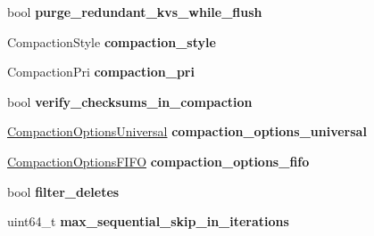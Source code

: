 \begin{DoxyCompactItemize}
\item 
bool {\bfseries purge\+\_\+redundant\+\_\+kvs\+\_\+while\+\_\+flush}\hypertarget{structrocksdb_1_1ColumnFamilyOptions_ad2a4d376117a9caa7d25b3aa15c9d7b9}{}\label{structrocksdb_1_1ColumnFamilyOptions_ad2a4d376117a9caa7d25b3aa15c9d7b9}

\item 
Compaction\+Style {\bfseries compaction\+\_\+style}\hypertarget{structrocksdb_1_1ColumnFamilyOptions_af23f2504801df411a8ba336743bc3481}{}\label{structrocksdb_1_1ColumnFamilyOptions_af23f2504801df411a8ba336743bc3481}

\item 
Compaction\+Pri {\bfseries compaction\+\_\+pri}\hypertarget{structrocksdb_1_1ColumnFamilyOptions_a0795b8f337f5a63fd9666648202a02e3}{}\label{structrocksdb_1_1ColumnFamilyOptions_a0795b8f337f5a63fd9666648202a02e3}

\item 
bool {\bfseries verify\+\_\+checksums\+\_\+in\+\_\+compaction}\hypertarget{structrocksdb_1_1ColumnFamilyOptions_a467caa4ed08291dccd0e378edfaf99ab}{}\label{structrocksdb_1_1ColumnFamilyOptions_a467caa4ed08291dccd0e378edfaf99ab}

\item 
\hyperlink{classrocksdb_1_1CompactionOptionsUniversal}{Compaction\+Options\+Universal} {\bfseries compaction\+\_\+options\+\_\+universal}\hypertarget{structrocksdb_1_1ColumnFamilyOptions_a487e37a1e34823d87fc24d0fbd03ee46}{}\label{structrocksdb_1_1ColumnFamilyOptions_a487e37a1e34823d87fc24d0fbd03ee46}

\item 
\hyperlink{structrocksdb_1_1CompactionOptionsFIFO}{Compaction\+Options\+F\+I\+FO} {\bfseries compaction\+\_\+options\+\_\+fifo}\hypertarget{structrocksdb_1_1ColumnFamilyOptions_ac9c65f6f6da764046ce6b1f69d68526d}{}\label{structrocksdb_1_1ColumnFamilyOptions_ac9c65f6f6da764046ce6b1f69d68526d}

\item 
bool {\bfseries filter\+\_\+deletes}\hypertarget{structrocksdb_1_1ColumnFamilyOptions_a8fc54e6814cf87a7cc138e03f165376a}{}\label{structrocksdb_1_1ColumnFamilyOptions_a8fc54e6814cf87a7cc138e03f165376a}

\item 
uint64\+\_\+t {\bfseries max\+\_\+sequential\+\_\+skip\+\_\+in\+\_\+iterations}\hypertarget{structrocksdb_1_1ColumnFamilyOptions_a5a584b6d8a12d67a6a518b72772314a0}{}\label{structrocksdb_1_1ColumnFamilyOptions_a5a584b6d8a12d67a6a518b72772314a0}


\end{DoxyCompactItemize}
